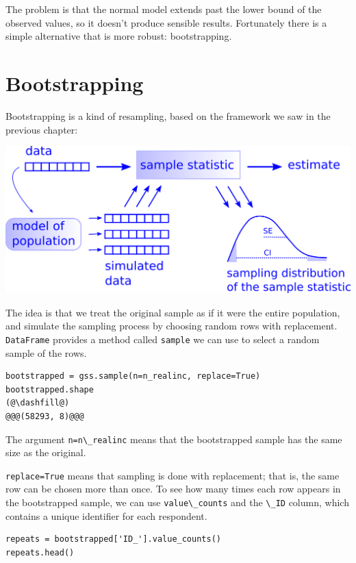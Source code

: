 The problem is that the normal model extends past the lower bound of the
observed values, so it doesn't produce sensible results. Fortunately
there is a simple alternative that is more robust: bootstrapping.

\hypertarget{bootstrapping}{%
\section{Bootstrapping}\label{bootstrapping}}

Bootstrapping is a kind of resampling, based on the framework we saw in
the previous chapter:

\includegraphics{chapters/figs/resampling.png}

The idea is that we treat the original sample as if it were the entire
population, and simulate the sampling process by choosing random rows
with replacement. \passthrough{\lstinline!DataFrame!} provides a method
called \passthrough{\lstinline!sample!} we can use to select a random
sample of the rows.

\begin{lstlisting}[]
bootstrapped = gss.sample(n=n_realinc, replace=True)
bootstrapped.shape
(@\dashfill@)
@@@(58293, 8)@@@
\end{lstlisting}

The argument \passthrough{\lstinline!n=n\_realinc!} means that the
bootstrapped sample has the same size as the original.

\passthrough{\lstinline!replace=True!} means that sampling is done with
replacement; that is, the same row can be chosen more than once. To see
how many times each row appears in the bootstrapped sample, we can use
\passthrough{\lstinline!value\_counts!} and the
\passthrough{\lstinline!\_ID!} column, which contains a unique
identifier for each respondent.

\begin{lstlisting}[]
repeats = bootstrapped['ID_'].value_counts()
repeats.head()
\end{lstlisting}

